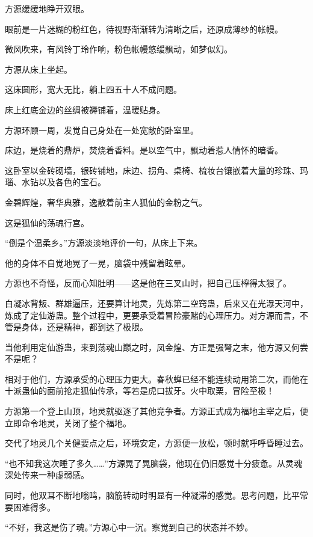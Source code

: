 
\begin{this_body}



方源缓缓地睁开双眼。

眼前是一片迷糊的粉红色，待视野渐渐转为清晰之后，还原成薄纱的帐幔。

微风吹来，有风铃丁玲作响，粉色帐幔悠缓飘动，如梦似幻。

方源从床上坐起。

这床圆形，宽大无比，躺上四五十人不成问题。

床上红底金边的丝绸被褥铺着，温暖贴身。

方源环顾一周，发觉自己身处在一处宽敞的卧室里。

床边，是烧着的鼎炉，焚烧着香料。是以空气中，飘动着惹人情怀的暗香。

这卧室以金砖砌墙，银砖铺地，床边、拐角、桌椅、梳妆台镶嵌着大量的珍珠、玛瑙、水钻以及各色的宝石。

金碧辉煌，奢华典雅，逸散着前主人狐仙的金粉之气。

这是狐仙的荡魂行宫。

“倒是个温柔乡。”方源淡淡地评价一句，从床上下来。

他的身体不自觉地晃了一晃，脑袋中残留着眩晕。

方源也不奇怪，反而心知肚明——这是他在三叉山时，把自己压榨得太狠了。

白凝冰背叛、群雄逼压，还要算计地灵，先炼第二空窍蛊，后来又在光瀑天河中，炼成了定仙游蛊。整个过程中，更要承受着冒险豪赌的心理压力。对方源而言，不管是身体，还是精神，都到达了极限。

当他利用定仙游蛊，来到荡魂山巅之时，凤金煌、方正是强弩之末，他方源又何尝不是呢？

相对于他们，方源承受的心理压力更大。春秋蝉已经不能连续动用第二次，而他在十派蛊仙的面前抢走狐仙传承，等若是虎口拔牙。火中取栗，冒险至极！

方源第一个登上山顶，地灵就驱逐了其他竞争者。方源正式成为福地主宰之后，便立即命令地灵，关闭了整个福地。

交代了地灵几个关健要点之后，环境安定，方源便一放松，顿时就呼呼昏睡过去。

“也不知我这次睡了多久……”方源晃了晃脑袋，他现在仍旧感觉十分疲惫。从灵魂深处传来一种虚弱感。

同时，他双耳不断地嗡鸣，脑筋转动时明显有一种凝滞的感觉。思考问题，比平常要困难得多。

“不好，我这是伤了魂。”方源心中一沉。察觉到自己的状态并不妙。


\end{this_body}
